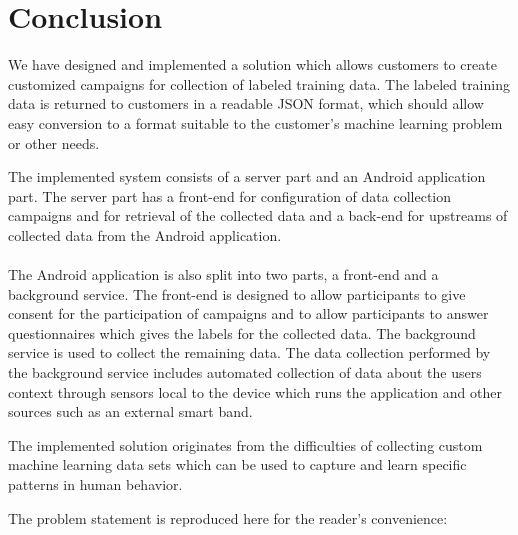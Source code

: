 
\chapter{Conclusion}
\label{cha:conclusion}

We have designed and implemented a solution which allows customers to create customized campaigns for collection of labeled training data. The labeled training data is returned to customers in a readable JSON format, which should allow easy conversion to a format suitable to the customer's machine learning problem or other needs. 

The implemented system consists of a server part and an Android application part. The server part has a front-end for configuration of data collection campaigns and for retrieval of the collected data and a back-end for upstreams of collected data from the Android application. 
\\\\
The Android application is also split into two parts, a front-end and a background service. The front-end is designed to allow participants to give consent for the participation of campaigns and to allow participants to answer questionnaires which gives the labels for the collected data. The background service is used to collect the remaining data. The data collection performed by the background service includes automated collection of data about the users context through sensors local to the device which runs the application and other sources such as an external smart band. 


The implemented solution originates from the difficulties of collecting custom machine learning data sets which can be used to capture and learn specific patterns in human behavior.  

The problem statement is reproduced here for the reader's convenience:
\\\\




